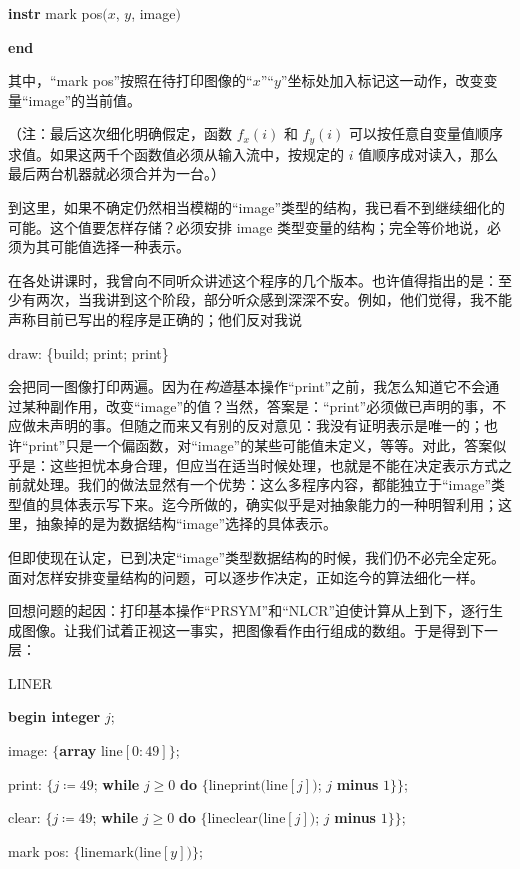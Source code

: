 \quad\textbf{instr} mark pos$(x$, $y$, image$)$

\textbf{end}

\noindent
其中，“mark pos”按照在待打印图像的“$x$”“$y$”坐标处加入标记这一动作，改变变量“image”的当前值。

（注：最后这次细化明确假定，函数 $f_x(i)$ 和 $f_y(i)$ 可以按任意自变量值顺序求值。如果这两千个函数值必须从输入流中，按规定的 $i$ 值顺序成对读入，那么最后两台机器就必须合并为一台。）

到这里，如果不确定仍然相当模糊的“image”类型的结构，我已看不到继续细化的可能。这个值要怎样存储？必须安排 image 类型变量的结构；完全等价地说，必须为其可能值选择一种表示。

在各处讲课时，我曾向不同听众讲述这个程序的几个版本。也许值得指出的是：至少有两次，当我讲到这个阶段，部分听众感到深深不安。例如，他们觉得，我不能声称目前已写出的程序是正确的；他们反对我说

draw: \{build; print; print\}

\noindent
会把同一图像打印两遍。因为在\textit{构造}基本操作“print”之前，我怎么知道它不会通过某种副作用，改变“image”的值？当然，答案是：“print”必须做已声明的事，不应做未声明的事。但随之而来又有别的反对意见：我没有证明表示是唯一的；也许“print”只是一个偏函数，对“image”的某些可能值未定义，等等。对此，答案似乎是：这些担忧本身合理，但应当在适当时候处理，也就是不能在决定表示方式之前就处理。我们的做法显然有一个优势：这么多程序内容，都能独立于“image”类型值的具体表示写下来。迄今所做的，确实似乎是对抽象能力的一种明智利用；这里，抽象掉的是为数据结构“image”选择的具体表示。

但即使现在认定，已到决定“image”类型数据结构的时候，我们仍不必完全定死。面对怎样安排变量结构的问题，可以逐步作决定，正如迄今的算法细化一样。

回想问题的起因：打印基本操作“PRSYM”和“NLCR”迫使计算从上到下，逐行生成图像。让我们试着正视这一事实，把图像看作由行组成的数组。于是得到下一层：

LINER

\textbf{begin integer} $j$;

\quad image: $\{$\textbf{array} line$[0: 49]\}$;

\quad print: $\{j \coloneq 49$; \textbf{while} $j \geqslant 0$ \textbf{do} $\{$lineprint$($line$[j])$; $j$ \textbf{minus} $1\}\}$;

\quad clear: $\{j \coloneq 49$; \textbf{while} $j \geqslant 0$ \textbf{do} $\{$lineclear$($line$[j])$; $j$ \textbf{minus} $1\}\}$;

\quad mark pos: $\{$linemark$($line$[y])\}$;


